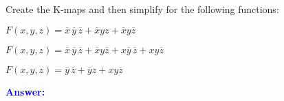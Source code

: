\item{}
Create the K-maps and then simplify for the following functions:
\begin{list}{\textbf{}}{}
    \item $F(x,y,z)=\overline{x}\,\overline{y}\,\overline{z}+\overline{x}yz+
    \overline{x}y\overline{z}$
    \item $F(x,y,z)=\overline{x}\,\overline{y}\,\overline{z}+
    \overline{x}y\overline{z}+x\overline{y}\,\overline{z}+xy\overline{z}$
    \item $F(x,y,z)=\overline{y}\,\overline{z}+\overline{y}z+xy\overline{z}$
\end{list}
\vskip12pt
\ifanswers
\textcolor{blue}{
\textbf{Answer:}\\
\begin{list}{\textbf{}}{}
\item 
\end{list}
}
\newpage
\fi
